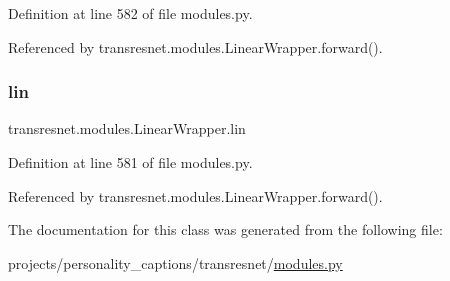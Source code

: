 Definition at line 582 of file modules.\+py.



Referenced by transresnet.\+modules.\+Linear\+Wrapper.\+forward().

\mbox{\label{classtransresnet_1_1modules_1_1LinearWrapper_a499218599133063e99a71113b4a8b440}} 
\subsubsection{\texorpdfstring{lin}{lin}}
{\footnotesize\ttfamily transresnet.\+modules.\+Linear\+Wrapper.\+lin}



Definition at line 581 of file modules.\+py.



Referenced by transresnet.\+modules.\+Linear\+Wrapper.\+forward().



The documentation for this class was generated from the following file\+:\begin{DoxyCompactItemize}
\item 
projects/personality\+\_\+captions/transresnet/\hyperlink{projects_2personality__captions_2transresnet_2modules_8py}{modules.\+py}\end{DoxyCompactItemize}
